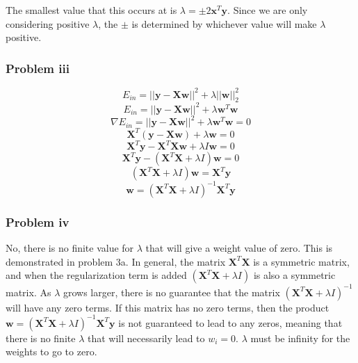 \documentclass[12pt]{article} %
\begin{document}
The smallest value that this occurs at is $\lambda = \pm2\textbf{x}^{T}\textbf{y}$. Since we are only considering positive $\lambda$, the $\pm$ is determined by whichever value will make $\lambda$ positive.

\subsubsection{Problem iii}
$$E_{in} = ||\textbf{y} - \textbf{X}\textbf{w}||^2 + \lambda||\textbf{w}||_2^2$$
$$E_{in} = ||\textbf{y} - \textbf{X}\textbf{w}||^2 + \lambda\textbf{w}^T\textbf{w}$$
$$\nabla E_{in} = ||\textbf{y} - \textbf{X}\textbf{w}||^2 + \lambda\textbf{w}^T\textbf{w} = 0$$
$$\textbf{X}^T(\textbf{y} - \textbf{X}\textbf{w}) + \lambda\textbf{w} = 0$$
$$\textbf{X}^T\textbf{y} - \textbf{X}^T\textbf{X}\textbf{w} + \lambda I\textbf{w} = 0$$
$$\textbf{X}^T\textbf{y} - (\textbf{X}^T\textbf{X} + \lambda I)\textbf{w} = 0$$
$$ (\textbf{X}^T\textbf{X} + \lambda I)\textbf{w} = \textbf{X}^T\textbf{y}$$
$$ \textbf{w} = (\textbf{X}^T\textbf{X} + \lambda I)^{-1}\textbf{X}^T\textbf{y}$$

\subsubsection{Problem iv}
No, there is no finite value for $\lambda$ that will give a weight value of zero. This is demonstrated in problem 3a.  In general, the matrix $\textbf{X}^T\textbf{X}$  is a symmetric matrix, and when the regularization term is added $(\textbf{X}^T\textbf{X} + \lambda I)$ is also a symmetric matrix. As $\lambda$ grows larger, there is no guarantee that the matrix $(\textbf{X}^T\textbf{X} +\lambda I)^{-1}$ will have any zero terms. If this matrix has no zero terms, then the product $ \textbf{w} = (\textbf{X}^T\textbf{X} + \lambda I)^{-1}\textbf{X}^T\textbf{y}$ is not guaranteed to lead to any zeros, meaning that there is no finite $\lambda$ that will necessarily lead to $w_i = 0$. $\lambda$ must be infinity for the weights to go to zero.
\end{document}
